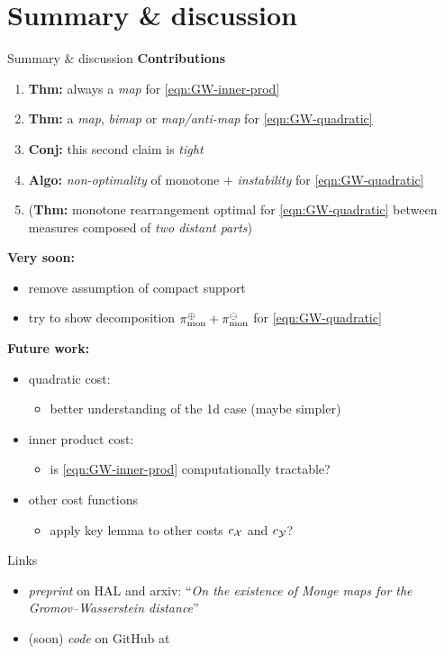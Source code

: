 \documentclass[9pt,xcolor={dvipsnames}]{beamer}
\begin{document}
\section{Summary \& discussion}
\begin{frame}{Summary \& discussion}
    \textbf{Contributions}
    \begin{enumerate}
        \item \textbf{Thm:} always a \emph{map} for \cref{eqn:GW-inner-prod}
        \item \textbf{Thm:} a \emph{map}, \emph{bimap} or \emph{map/anti-map} for \cref{eqn:GW-quadratic}
        \item \textbf{Conj:} this second claim is \emph{tight}
        \item \textbf{Algo:} \emph{non-optimality} of monotone + \emph{instability} for \cref{eqn:GW-quadratic}
        \item (\textbf{Thm:} monotone rearrangement optimal for \cref{eqn:GW-quadratic} between measures composed of \emph{two distant parts})
    \end{enumerate}
\vfill
\textbf{Very soon:}
\begin{itemize}
    \item remove assumption of compact support
    \item try to show decomposition $\pi_\text{mon}^\oplus+\pi_\text{mon}^\ominus$ for \cref{eqn:GW-quadratic}
\end{itemize}
\vfill
\textbf{Future work:}
\begin{itemize}
    \item quadratic cost: \begin{itemize}
        \item better understanding of the 1d case (maybe simpler)
    \end{itemize}
    \item inner product cost: \begin{itemize}
        \item is \cref{eqn:GW-inner-prod} computationally tractable?
    \end{itemize}
    \item other cost functions \begin{itemize}
        \item apply key lemma to other costs $c_{\mathcal{X}}$ and $c_{\mathcal{Y}}$?
    \end{itemize}
\end{itemize}
\end{frame}
\begin{frame}{Links}
    \begin{itemize}
        \item \emph{preprint} on HAL and arxiv: ``\textit{On the existence of Monge maps for the Gromov--Wasserstein distance}'' 
        \item (soon) \emph{code} on GitHub at 
    \end{itemize}
\end{frame}
\end{document}
